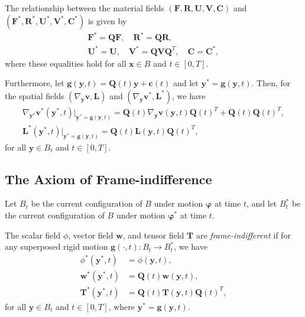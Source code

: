 \documentclass[
  letterpaper,
  DIV=11,
  numbers=noendperiod]{scrreprt}
\theoremstyle{plain}
\theoremstyle{remark}
\begin{document}
The relationship between the material fields
\(({\boldsymbol{F}},{\boldsymbol{R}},{\boldsymbol{U}},{\boldsymbol{V}},{\boldsymbol{C}})\)
and
\(({\boldsymbol{F}}^*,{\boldsymbol{R}}^*,{\boldsymbol{U}}^*,{\boldsymbol{V}}^*,{\boldsymbol{C}}^*)\)
is given by \[\begin{gathered}
      {\boldsymbol{F}}^*={\boldsymbol{Q}}{\boldsymbol{F}},\quad{\boldsymbol{R}}^*={\boldsymbol{Q}}{\boldsymbol{R}},\\
      {\boldsymbol{U}}^*={\boldsymbol{U}},\quad{\boldsymbol{V}}^*={\boldsymbol{Q}}{\boldsymbol{V}}{\boldsymbol{Q}}^T,\quad{\boldsymbol{C}}= {\boldsymbol{C}}^*,
    \end{gathered}\] where these equalities hold for all
\({\boldsymbol{x}}\in B\) and \(t\in[0,T]\).

Furthermore, let
\({\boldsymbol{g}}({\boldsymbol{y}},t) = {\boldsymbol{Q}}(t){\boldsymbol{y}}+{\boldsymbol{c}}(t)\)
and let \({\boldsymbol{y}}^*={\boldsymbol{g}}({\boldsymbol{y}},t)\).
Then, for the spatial fields
\((\nabla_{\boldsymbol{y}}{\boldsymbol{v}},{\boldsymbol{L}})\) and
\((\nabla_{\boldsymbol{y}}{\boldsymbol{v}}^*,{\boldsymbol{L}}^*)\), we
have \[\begin{gathered}
      \nabla_{{\boldsymbol{y}}^*}{\boldsymbol{v}}^*({\boldsymbol{y}}^*,t)\Big|_{{\boldsymbol{y}}^*={\boldsymbol{g}}({\boldsymbol{y}},t)} = {\boldsymbol{Q}}(t)\nabla_{\boldsymbol{y}}{\boldsymbol{v}}({\boldsymbol{y}},t){\boldsymbol{Q}}(t)^T+\dot{\boldsymbol{Q}}(t){\boldsymbol{Q}}(t)^T,\\
      {\boldsymbol{L}}^*({\boldsymbol{y}}^*,t)\Big|_{{\boldsymbol{y}}^*={\boldsymbol{g}}({\boldsymbol{y}},t)} = {\boldsymbol{Q}}(t){\boldsymbol{L}}({\boldsymbol{y}},t){\boldsymbol{Q}}(t)^T,
    \end{gathered}\] for all \({\boldsymbol{y}}\in B_t\) and
\(t\in[0,T]\).

\subsection{The Axiom of
Frame-indifference}\label{the-axiom-of-frame-indifference}

Let \(B_t\) be the current configuration of \(B\) under motion
\({\boldsymbol{\varphi}}\) at time \(t\), and let \(B^*_t\) be the
current configuration of \(B\) under motion \({\boldsymbol{\varphi}}^*\)
at time \(t\).

The scalar field \(\phi\), vector field \({\boldsymbol{w}}\), and tensor
field \({\boldsymbol{T}}\) are \emph{frame-indifferent} if for any
superposed rigid motion \({\boldsymbol{g}}(\cdot,t):B_t\to B^*_t\), we
have \[\begin{aligned}
  \phi^*({\boldsymbol{y}}^*,t) &= \phi({\boldsymbol{y}},t),\\
  {\boldsymbol{w}}^*({\boldsymbol{y}}^*,t) &= {\boldsymbol{Q}}(t){\boldsymbol{w}}({\boldsymbol{y}},t),\\
  {\boldsymbol{T}}^*({\boldsymbol{y}}^*,t) &= {\boldsymbol{Q}}(t){\boldsymbol{T}}({\boldsymbol{y}},t){\boldsymbol{Q}}(t)^T,
\end{aligned}\] for all \({\boldsymbol{y}}\in B_t\) and \(t\in[0,T]\),
where \({\boldsymbol{y}}^*={\boldsymbol{g}}({\boldsymbol{y}},t)\).
\end{document}
